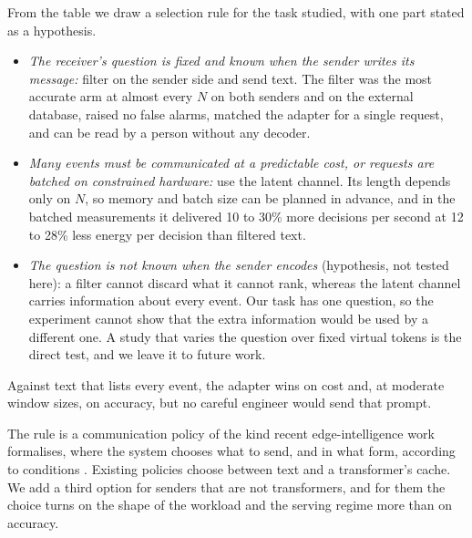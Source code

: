 From the table we draw a selection rule for the task studied, with one part stated as a hypothesis.
\begin{itemize}
\item \emph{The receiver's question is fixed and known when the sender writes its message:} filter on the sender side and send text. The filter was the most accurate arm at almost every $N$ on both senders and on the external database, raised no false alarms, matched the adapter for a single request, and can be read by a person without any decoder.
\item \emph{Many events must be communicated at a predictable cost, or requests are batched on constrained hardware:} use the latent channel. Its length depends only on $N$, so memory and batch size can be planned in advance, and in the batched measurements it delivered 10 to 30\% more decisions per second at 12 to 28\% less energy per decision than filtered text.
\item \emph{The question is not known when the sender encodes} (hypothesis, not tested here): a filter cannot discard what it cannot rank, whereas the latent channel carries information about every event. Our task has one question, so the experiment cannot show that the extra information would be used by a different one. A study that varies the question over fixed virtual tokens is the direct test, and we leave it to future work.
\end{itemize}
Against text that lists every event, the adapter wins on cost and, at moderate window sizes, on accuracy, but no careful engineer would send that prompt.

The rule is a communication policy of the kind recent edge-intelligence work formalises, where the system chooses what to send, and in what form, according to conditions \cite{aei2026survey,dai2026tokenkv}. Existing policies choose between text and a transformer's cache. We add a third option for senders that are not transformers, and for them the choice turns on the shape of the workload and the serving regime more than on accuracy.

